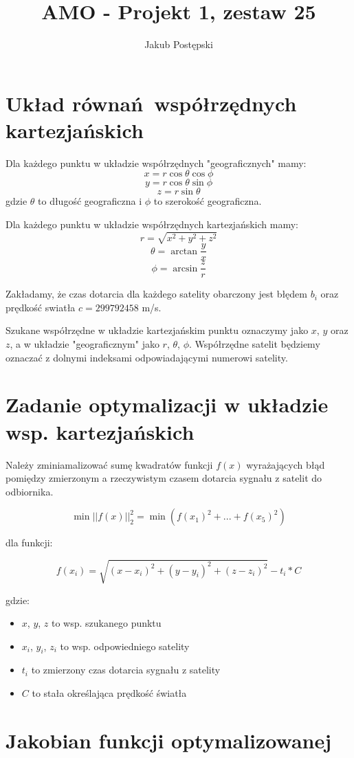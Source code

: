 \documentclass[]{article}
\title{AMO - Projekt 1, zestaw 25}
\author{Jakub Postępski}
\begin{document}
\maketitle


\section{Układ równań współrzędnych kartezjańskich}
Dla każdego punktu w układzie współrzędnych "geograficznych" mamy:
\[ x = r\cos \theta \cos \phi \]
\[ y = r\cos \theta \sin \phi \]
\[ z = r\sin \theta \]
gdzie $ \theta $ to długość geograficzna i $ \phi $ to szerokość geograficzna.

Dla każdego punktu w układzie współrzędnych kartezjańskich mamy:
\[ r = \sqrt{x^2 + y^2 + z^2}\]
\[ \theta = \arctan \frac{y}{x} \]
\[ \phi = \arcsin \frac{z}{r} \]

Zakładamy, że czas dotarcia dla każdego satelity obarczony jest błędem $b_i$ oraz prędkość swiatła $c=299792458$ m/s.

Szukane współrzędne w układzie kartezjańskim punktu oznaczymy jako $x$, $y$ oraz $z$, a w układzie "geograficznym" jako $r$, $\theta$, $\phi$. Współrzędne satelit będziemy oznaczać z dolnymi indeksami odpowiadającymi numerowi satelity.


\section{Zadanie optymalizacji w układzie wsp. kartezjańskich} 
Należy zminiamalizować sumę kwadratów funkcji $f(x)$ wyrażających błąd pomiędzy zmierzonym a rzeczywistym czasem dotarcia sygnału z satelit do odbiornika.

\[ \min || f(x) ||^2_2 = \min (f(x_1)^2 + ... + f(x_5)^2)\]

dla funkcji:

\[ f(x_i) = \sqrt{(x-x_i)^2 + (y-y_i)^2 + (z-z_i)^2}-t_i*C\]

gdzie: 
\begin{itemize}
	\item $x$, $y$, $z$ to wsp. szukanego punktu
	\item $x_i$, $y_i$, $z_i$ to wsp. odpowiedniego satelity
	\item $t_i$ to zmierzony czas dotarcia sygnału z satelity
	\item $C$ to stała określająca prędkość światła
\end{itemize}

\section{Jakobian funkcji optymalizowanej}
\end{document}
